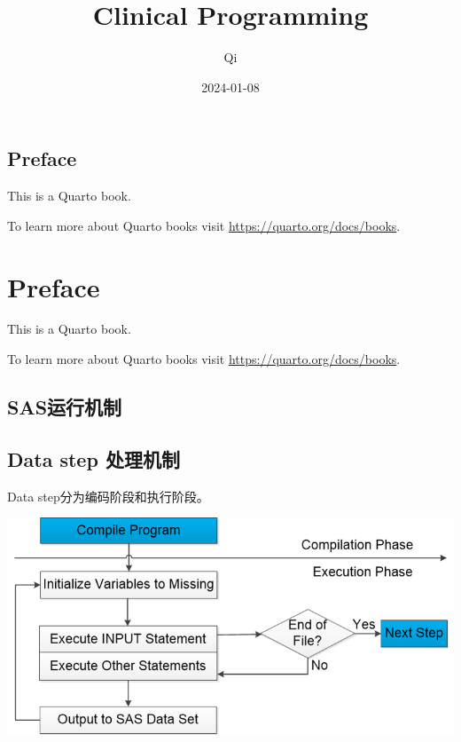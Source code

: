 \documentclass[
  letterpaper,
  DIV=11,
  numbers=noendperiod]{scrreprt}
\title{Clinical Programming}
\author{Qi}
\date{2024-01-08}
\renewcommand*\contentsname{Table of contents}
\newcommand\contentsname{Table of contents}
\begin{document}
\maketitle
\ifdefined\Shaded\renewenvironment{Shaded}{\begin{tcolorbox}[boxrule=0pt, sharp corners, interior hidden, breakable, frame hidden, enhanced, borderline west={3pt}{0pt}{shadecolor}]}{\end{tcolorbox}}\fi

\renewcommand*\contentsname{Table of contents}
{
\hypersetup{linkcolor=}
\setcounter{tocdepth}{2}
\tableofcontents
}

\hypertarget{preface}{%
\chapter*{Preface}\label{preface}}


This is a Quarto book.

To learn more about Quarto books visit
\url{https://quarto.org/docs/books}.

\part{Preface}

This is a Quarto book.

To learn more about Quarto books visit
\url{https://quarto.org/docs/books}.

\hypertarget{sasux8fd0ux884cux673aux5236}{%
\chapter{SAS运行机制}\label{sasux8fd0ux884cux673aux5236}}

\hypertarget{data-step-ux5904ux7406ux673aux5236}{%
\chapter*{Data step 处理机制}\label{data-step-ux5904ux7406ux673aux5236}}


Data step分为编码阶段和执行阶段。

\includegraphics{images/图片1.png}
\end{document}
